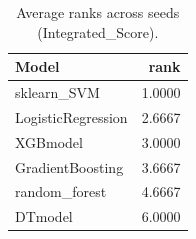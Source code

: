 \begin{table}[t]
\centering
\begin{tabular}{lr}
\toprule
Model & rank \\
\midrule
sklearn_SVM & 1.0000 \\
LogisticRegression & 2.6667 \\
XGBmodel & 3.0000 \\
GradientBoosting & 3.6667 \\
random_forest & 4.6667 \\
DTmodel & 6.0000 \\
\bottomrule
\end{tabular}
\caption{Average ranks across seeds (Integrated_Score).}
\label{tab:avg_rank_Integrated_Score}
\end{table}